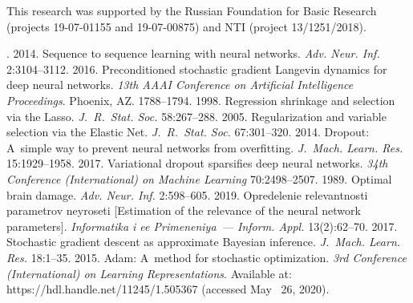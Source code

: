 

\vspace*{-12pt}

\Ack

\vspace*{-3pt}

\noindent
 This research was supported by the Russian Foundation for Basic Research 
 (projects 19-07-01155 and 19-07-00875) and NTI (project 13/1251/2018).


 \begin{multicols}{2}

\renewcommand{\bibname}{\protect\rmfamily References}

{\small\frenchspacing
 {%
 \begin{thebibliography}{99}

. 2014. Sequence to sequence learning with neural 
networks. \textit{Adv. Neur. Inf.} 2:3104--3112.
 2016. Preconditioned stochastic gradient Langevin 
dynamics for deep neural networks. \textit{13th AAAI Conference on Artificial Intelligence 
Proceedings}. Phoenix, AZ. 1788--1794.
 1998. Regression shrinkage and selection via the Lasso. 
\textit{J.~R.~Stat. Soc.} 58:267--288.
 2005. Regularization and variable selection
 via the Elastic Net. \textit{J.~R.~Stat. Soc.} 67:301--320.
 2014. Dropout: 
A~simple way to prevent neural networks from overfitting. \textit{J.~Mach. Learn.
Res.}  15:1929--1958.
 2017. Variational dropout sparsifies deep neural 
networks. \textit{34th Conference (International) on Machine Learning} 70:2498--2507.
 1989. Optimal brain damage. 
\textit{Adv.  Neur. Inf.} 2:598--605.
 2019. Opredelenie relevantnosti 
parametrov neyroseti [Estimation of the relevance of the neural network parameters]. \textit{Informatika 
i ee Primeneniya~--- Inform. Appl.} 13(2):62--70.
 2017. Stochastic gradient descent as approximate Bayesian 
inference. \textit{J.~Mach. Learn. Res.} 18:1--35.
 2015. Adam: A~method for stochastic optimization. \textit{3rd 
Conference (International) on Learning Representations}. Available at: {\sf 
https://hdl.\linebreak handle.net/11245/1.505367} (accessed May~ 26, 2020). 


\end{thebibliography}}}
\end{multicols}
